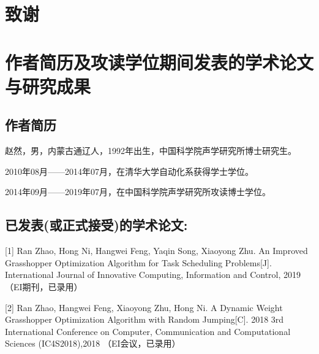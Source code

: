\chapter[致谢]{致\quad 谢}%
\thispagestyle{noheaderstyle}%










\chapter{作者简历及攻读学位期间发表的学术论文与研究成果}


\section*{作者简历}

赵然，男，内蒙古通辽人，1992年出生，中国科学院声学研究所博士研究生。

2010年08月——2014年07月，在清华大学自动化系获得学士学位。

2014年09月——2019年07月，在中国科学院声学研究所攻读博士学位。


\section*{已发表(或正式接受)的学术论文:}

[1] Ran Zhao, Hong Ni, Hangwei Feng, Yaqin Song, Xiaoyong Zhu. An Improved Grasshopper Optimization Algorithm for Task Scheduling Problems[J]. International Journal of Innovative Computing, Information and Control, 2019（EI期刊，已录用）

[2] Ran Zhao, Hangwei Feng, Xiaoyong Zhu, Hong Ni. A Dynamic Weight Grasshopper Optimization Algorithm with Random Jumping[C]. 2018 3rd International Conference on Computer, Communication and Computational Sciences (IC4S2018),2018 （EI会议，已录用）


